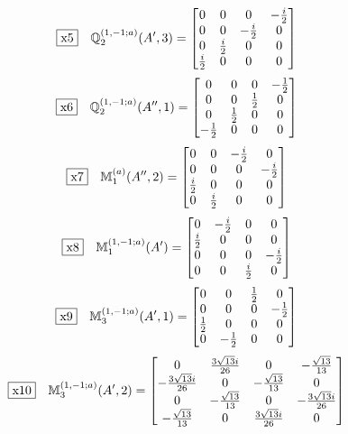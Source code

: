 \documentclass[fleqn,10pt,landscape]{jsarticle}
\begin{document}
\begin{dmath*}
\fbox{x5}\quad \mathbb{Q}_{2}^{(1,-1;a)}(A^{\prime},3)=\begin{bmatrix} 0 & 0 & 0 & - \frac{i}{2} \\ 0 & 0 & - \frac{i}{2} & 0 \\ 0 & \frac{i}{2} & 0 & 0 \\ \frac{i}{2} & 0 & 0 & 0 \end{bmatrix}
\end{dmath*}
\begin{dmath*}
\fbox{x6}\quad \mathbb{Q}_{2}^{(1,-1;a)}(A^{\prime\prime},1)=\begin{bmatrix} 0 & 0 & 0 & - \frac{1}{2} \\ 0 & 0 & \frac{1}{2} & 0 \\ 0 & \frac{1}{2} & 0 & 0 \\ - \frac{1}{2} & 0 & 0 & 0 \end{bmatrix}
\end{dmath*}
\begin{dmath*}
\fbox{x7}\quad \mathbb{M}_{1}^{(a)}(A^{\prime\prime},2)=\begin{bmatrix} 0 & 0 & - \frac{i}{2} & 0 \\ 0 & 0 & 0 & - \frac{i}{2} \\ \frac{i}{2} & 0 & 0 & 0 \\ 0 & \frac{i}{2} & 0 & 0 \end{bmatrix}
\end{dmath*}
\begin{dmath*}
\fbox{x8}\quad \mathbb{M}_{1}^{(1,-1;a)}(A^{\prime})=\begin{bmatrix} 0 & - \frac{i}{2} & 0 & 0 \\ \frac{i}{2} & 0 & 0 & 0 \\ 0 & 0 & 0 & - \frac{i}{2} \\ 0 & 0 & \frac{i}{2} & 0 \end{bmatrix}
\end{dmath*}
\begin{dmath*}
\fbox{x9}\quad \mathbb{M}_{3}^{(1,-1;a)}(A^{\prime},1)=\begin{bmatrix} 0 & 0 & \frac{1}{2} & 0 \\ 0 & 0 & 0 & - \frac{1}{2} \\ \frac{1}{2} & 0 & 0 & 0 \\ 0 & - \frac{1}{2} & 0 & 0 \end{bmatrix}
\end{dmath*}
\begin{dmath*}
\fbox{x10}\quad \mathbb{M}_{3}^{(1,-1;a)}(A^{\prime},2)=\begin{bmatrix} 0 & \frac{3 \sqrt{13} i}{26} & 0 & - \frac{\sqrt{13}}{13} \\ - \frac{3 \sqrt{13} i}{26} & 0 & - \frac{\sqrt{13}}{13} & 0 \\ 0 & - \frac{\sqrt{13}}{13} & 0 & - \frac{3 \sqrt{13} i}{26} \\ - \frac{\sqrt{13}}{13} & 0 & \frac{3 \sqrt{13} i}{26} & 0 \end{bmatrix}
\end{dmath*}
\end{document}
